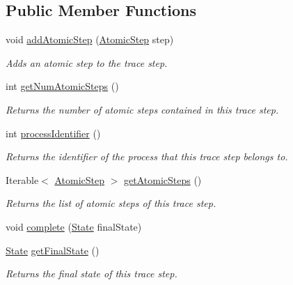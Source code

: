 \subsection*{Public Member Functions}
\begin{DoxyCompactItemize}
\item 
void \hyperlink{interfaceedu_1_1udel_1_1cis_1_1vsl_1_1civl_1_1kripke_1_1IF_1_1TraceStep_a73c69e4fbf7a429aa2f0536e42385bf4}{add\+Atomic\+Step} (\hyperlink{interfaceedu_1_1udel_1_1cis_1_1vsl_1_1civl_1_1kripke_1_1IF_1_1AtomicStep}{Atomic\+Step} step)
\begin{DoxyCompactList}\small\item\em Adds an atomic step to the trace step. \end{DoxyCompactList}\item 
int \hyperlink{interfaceedu_1_1udel_1_1cis_1_1vsl_1_1civl_1_1kripke_1_1IF_1_1TraceStep_ae18fe01159b91cd4224a548bac6aae98}{get\+Num\+Atomic\+Steps} ()
\begin{DoxyCompactList}\small\item\em Returns the number of atomic steps contained in this trace step. \end{DoxyCompactList}\item 
int \hyperlink{interfaceedu_1_1udel_1_1cis_1_1vsl_1_1civl_1_1kripke_1_1IF_1_1TraceStep_a7f46e65b0afcd1ab8900baa3ef364028}{process\+Identifier} ()
\begin{DoxyCompactList}\small\item\em Returns the identifier of the process that this trace step belongs to. \end{DoxyCompactList}\item 
Iterable$<$ \hyperlink{interfaceedu_1_1udel_1_1cis_1_1vsl_1_1civl_1_1kripke_1_1IF_1_1AtomicStep}{Atomic\+Step} $>$ \hyperlink{interfaceedu_1_1udel_1_1cis_1_1vsl_1_1civl_1_1kripke_1_1IF_1_1TraceStep_a96f1c0d4437ad0386abcca43c49dacb0}{get\+Atomic\+Steps} ()
\begin{DoxyCompactList}\small\item\em Returns the list of atomic steps of this trace step. \end{DoxyCompactList}\item 
void \hyperlink{interfaceedu_1_1udel_1_1cis_1_1vsl_1_1civl_1_1kripke_1_1IF_1_1TraceStep_a90fabd8d0cae466f4df76b1631ca86d1}{complete} (\hyperlink{interfaceedu_1_1udel_1_1cis_1_1vsl_1_1civl_1_1state_1_1IF_1_1State}{State} final\+State)
\item 
\hyperlink{interfaceedu_1_1udel_1_1cis_1_1vsl_1_1civl_1_1state_1_1IF_1_1State}{State} \hyperlink{interfaceedu_1_1udel_1_1cis_1_1vsl_1_1civl_1_1kripke_1_1IF_1_1TraceStep_a2b9d056a58e19a9cfd356bb7d6979aa7}{get\+Final\+State} ()
\begin{DoxyCompactList}\small\item\em Returns the final state of this trace step. \end{DoxyCompactList}\end{DoxyCompactItemize}


